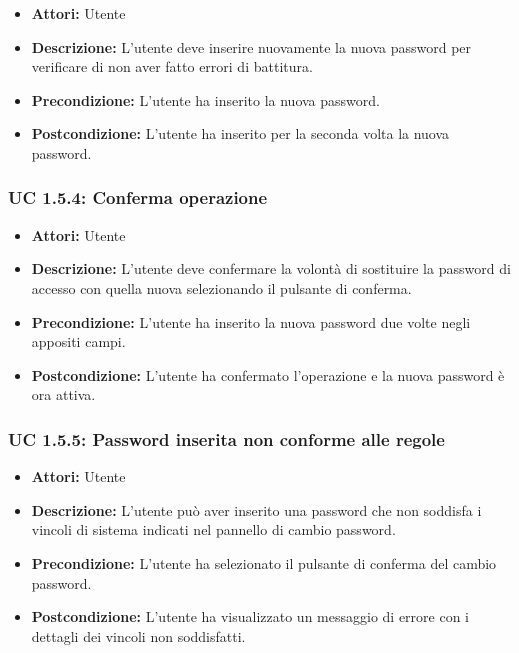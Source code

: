 \begin{itemize}
    \item \textbf{Attori:} Utente
    \item \textbf{Descrizione:} L'utente deve inserire nuovamente la nuova password per verificare di non aver fatto errori di battitura.
    \item \textbf{Precondizione:} L'utente ha inserito la nuova password.
    \item \textbf{Postcondizione:} L'utente ha inserito per la seconda volta la nuova password.
\end{itemize}

\subsubsection{UC 1.5.4: Conferma operazione}

\begin{itemize}
    \item \textbf{Attori:} Utente
    \item \textbf{Descrizione:} L'utente deve confermare la volontà di sostituire la password di accesso con quella nuova selezionando il pulsante di conferma.
    \item \textbf{Precondizione:} L'utente ha inserito la nuova password due volte negli appositi campi.
    \item \textbf{Postcondizione:} L'utente ha confermato l'operazione e la nuova password è ora attiva.
\end{itemize}

\subsubsection{UC 1.5.5: Password inserita non conforme alle regole}

\begin{itemize}
    \item \textbf{Attori:} Utente
    \item \textbf{Descrizione:} L'utente può aver inserito una password che non soddisfa i vincoli di sistema indicati nel pannello di cambio password.
    \item \textbf{Precondizione:} L'utente ha selezionato il pulsante di conferma del cambio password.
    \item \textbf{Postcondizione:} L'utente ha visualizzato un messaggio di errore con i dettagli dei vincoli non soddisfatti.
\end{itemize}

